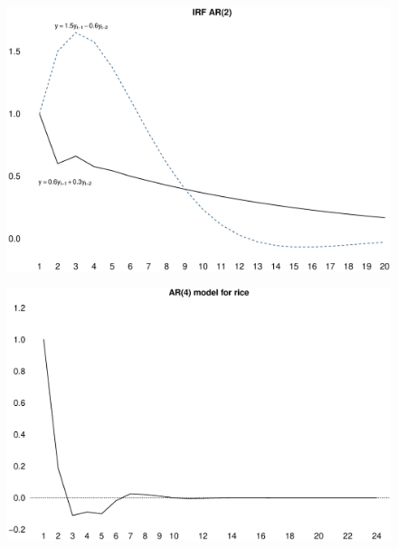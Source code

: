 \documentclass{beamer}
\begin{document}
\begin{frame}
  \begin{figure}
    \includegraphics[scale=.3]{irf_ar2.eps}
  \end{figure}
\end{frame}

\begin{frame}
  \begin{figure}
    \includegraphics[scale=.3]{rice4.eps}
  \end{figure}
\end{frame}
\end{document}

